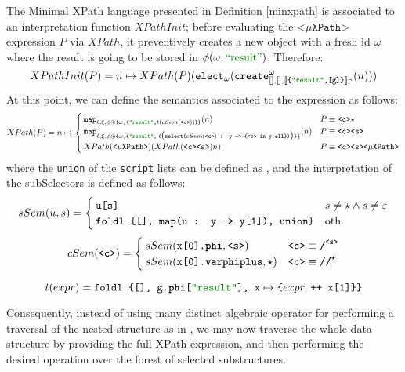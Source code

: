 \begin{definition}
The  Minimal XPath language presented in Definition \vref{minxpath} is associated to an interpretation function $XPathInit$; before evaluating the $\texttt{<}\mu\texttt{XPath}\texttt{>}$  expression $P$ via $XPath$, it preventively creates a new object with a fresh id $\omega$ where the result is going to be stored in $\phi(\omega,\mstr{result})$. Therefore:
\[XPathInit(P) = n\mapsto XPath(P) (\texttt{elect}_\omega(\texttt{create}^\omega_{[],[],\jsem{\texttt{\{\mstr{result},[g]\}}}_\Gamma}(n)))\]
At this point, we can define the semantics associated to the expression as follows:
\[XPath(P) = n\mapsto \begin{cases}
	\texttt{map}_{\ell,\xi,\phi\oplus \texttt{\{}\omega\texttt{,\{\mstr{result},}t(cSem(\texttt{<c>}))\texttt{\}\}} }(n) & P\equiv \texttt{<c>}\star\\
	\texttt{map}_{\ell,\xi,\phi\oplus\texttt{\{}\omega\texttt{,\{\mstr{result},}\;t\big(\texttt{select(} cSem(\texttt{<c>}) \texttt{ : y -> \{<s> in y.\textbf{ell}\})}\big)\texttt{\}}\}}(n) & P\equiv \texttt{<c>}\texttt{<s>}\\
	XPath(\texttt{<}\mu\texttt{XPath>}) (XPath(\texttt{<c><s>}) n ) & P\equiv \texttt{<c><s>}\texttt{<}\mu\texttt{XPath>}\\
\end{cases}\]
where the \texttt{union} of the \texttt{script} lists can be defined as , and the interpretation of the subSelectors is defined as follows:
\[sSem(u,s)=\begin{cases}
\texttt{u[s]} & s\neq \star\wedge s\neq \varepsilon\\
\texttt{foldl \{[], map(u : y -> y[1]), union\}} & \textup{oth.}\\
\end{cases}\]
\[cSem(\texttt{<c>})=\begin{cases}
 sSem(\texttt{x[0].\textbf{phi}},\texttt{<s>})\texttt{} & \texttt{<c>}\equiv\texttt{/}^\texttt{\texttt{<s>}}\\
 sSem(\texttt{x[0].\textbf{varphiplus}},\star)\texttt{} & \texttt{<c>}\equiv\texttt{//}^{\star}\\
\end{cases}\]

\[t(expr)=\texttt{foldl \{[], g.\textbf{phi}[\mstr{result}], x}\mapsto\texttt{\{}expr\texttt{ ++ x[1]\}\}}\]
\end{definition}

Consequently, instead of using many distinct algebraic operator for performing a traversal of the nested structure as in \cite{Magnani06}, we may now traverse the whole data structure by providing the full XPath expression, and then performing the desired operation over the forest of selected substructures.

